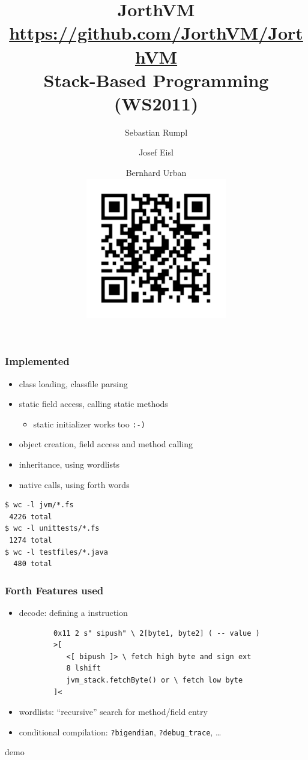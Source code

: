 \documentclass{beamer}
\title{JorthVM\\[0.2cm]\url{https://github.com/JorthVM/JorthVM}\\\small{Stack-Based Programming (WS2011)}}
\author{Sebastian Rumpl \and Josef Eisl \and Bernhard
Urban\\\includegraphics{../github}\vspace{-1cm}}
\begin{document}
\frame{\titlepage}
\begin{frame}[fragile]
	\frametitle{Implemented}
	\begin{itemize}
		\item class loading, classfile parsing
		\pause
		\item static field access, calling static methods
		\pause
		\begin{itemize}
			\pause
			\item static initializer works too \texttt{:-)}
		\end{itemize}
		\pause
		\item object creation, field access and method calling
		\pause
		\item inheritance, using wordlists
		\pause
		\item native calls, using forth words
	\end{itemize}
	\pause
	\small
\begin{verbatim}
$ wc -l jvm/*.fs
 4226 total
$ wc -l unittests/*.fs
 1274 total
$ wc -l testfiles/*.java
  480 total
\end{verbatim}
\end{frame}

\lstset{
	basicstyle=\scriptsize
}
\begin{frame}[fragile]
	\frametitle{Forth Features used}
	
	\begin{itemize}
		\item decode: defining a instruction
		\pause
		\begin{verbatim}
		0x11 2 s" sipush" \ 2[byte1, byte2] ( -- value )
		>[
		   <[ bipush ]> \ fetch high byte and sign ext
		   8 lshift
		   jvm_stack.fetchByte() or \ fetch low byte
		]<
		\end{verbatim}
		\pause
		\item wordlists: ``recursive'' search for method/field entry
		\pause
		\item conditional compilation: \texttt{?bigendian},
		\texttt{?debug\_trace}, \dots
	\end{itemize}
\end{frame}

\begin{frame}
	\begin{center}
		demo
	\end{center}
\end{frame}
\end{document}
